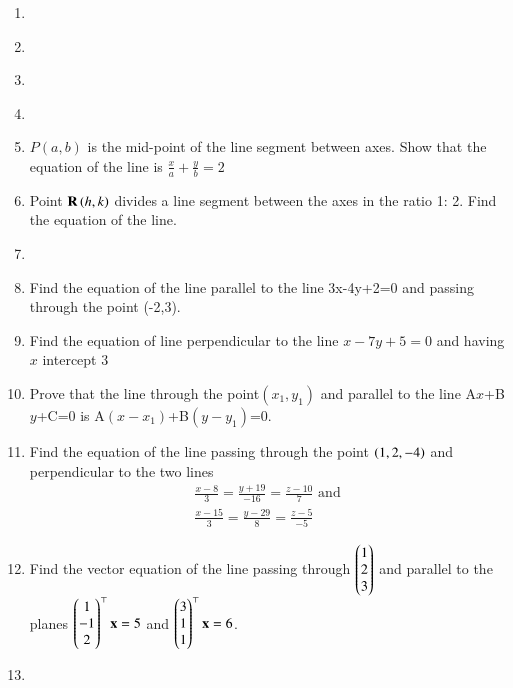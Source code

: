 \begin{enumerate}[label=\thesection.\arabic*,ref=\thesection.\theenumi]
\label{chapters/11/10/2/11}

\item 
\label{chapters/11/10/2/12}

\item 
\label{chapters/11/10/2/13}

\item 
\label{chapters/11/10/2/14}

\item 
\label{chapters/11/10/2/15}

\item 
$P(a,b)$ is the mid-point of the line segment between axes. Show that the equation of the line is $\frac{x}{a}+\frac{y}{b}=2$
\label{chapters/11/10/2/18}
\\
\solution

\item Point $\mathbf{R}\left(h, k\right)$ divides a line segment between the axes in the ratio 1: 2. Find the equation of the line.
\label{chapters/11/10/2/19}

\item 
\label{chapters/11/10/2/20}

\item Find the equation of the line  parallel to the line 3x-4y+2=0 and passing through the point (-2,3).
\label{chapters/11/10/3/7}

\item Find the equation of line perpendicular to the line $x-7y+5=0$ and having $x$ intercept $3$\\
\label{chapters/11/10/3/8}
\solution

\item Prove that the line through the point$(x_1,y_1)$ and parallel to the line A$x$+B$y$+C=0 is A$(x-x_1)$+B$(y-y_1)$=0.
\label{chapters/11/10/3/11}
\\
\solution

	\item Find the equation of the line passing through the point $\left(1,2,-4\right)$ and perpendicular to the two lines
\begin{align}
	\frac{x-8}{3}=\frac{y+19}{-16}=\frac{z-10}{7} \text{ and }\\ \frac{x-15}{3}=\frac{y-29}{8}=\frac{z-5}{-5} 
\end{align}
    \solution
		
	\item  Find the vector equation of the line passing through $\begin{pmatrix}1\\2\\3\end{pmatrix}$ and parallel to the planes $\begin{pmatrix}1\\-1\\2\end{pmatrix}^{\top}\mathbf{x} = 5$ and $\begin{pmatrix}3\\1\\1\end{pmatrix}^{\top}\mathbf{x} = 6$.  
    \solution
		
	\item
		
		\label{chapters/11/10/3/12}
\end{enumerate}
